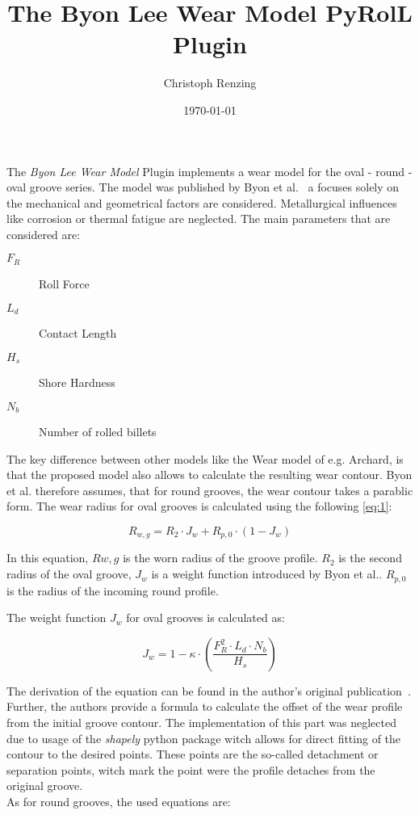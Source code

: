 \documentclass[11pt]{PyRollDocs}
\begin{document}
    \title{The Byon Lee Wear Model PyRolL Plugin}
    \author{Christoph Renzing}
    \date{\today}

    \maketitle

    The \emph{Byon Lee Wear Model} Plugin implements a wear model for the oval - round - oval groove series.
    The model was published by Byon et al.~\cite{Byon2007, Byon2008, Byon2008a} a focuses solely on the mechanical and geometrical factors are considered.
    Metallurgical influences like corrosion or thermal fatigue are neglected.
    The main parameters that are considered are:

    \begin{description}
        \item[$F_{R}$] Roll Force
        \item[$L_{d}$] Contact Length
        \item[$H_{s}$] Shore Hardness
        \item[$N_{b}$] Number of rolled billets
    \end{description}

    The key difference between other models like the Wear model of e.g. Archard, is that the proposed model also allows to calculate the resulting wear contour.
    Byon et al. therefore assumes, that for round grooves, the wear contour takes a parablic form.
    The wear radius for oval grooves is calculated using the following \autoref{eq:1}:

    \begin{equation}
        R_{w,g} = R_2 \cdot J_w + R_{p, 0} \cdot \left( 1 - J_w \right)
        \label{eq:1}
    \end{equation}

    In this equation, $R{w,g}$ is the worn radius of the groove profile.
    $R_2$ is the second radius of the oval groove, $J_w$ is a weight function introduced by Byon et al..
    $R_{p, 0}$ is the radius of the incoming round profile.

    The weight function $J_w$ for oval grooves is calculated as:

    \begin{equation}
        J_w = 1 - \kappa \cdot \left( \frac{F_R^2 \cdot L_d \cdot N_b}{H_s} \right)
        \label{eq:2}
    \end{equation}

    The derivation of the equation can be found in the author's original publication~\cite{Byon2008a}.
    Further, the authors provide a formula to calculate the offset of the wear profile from the initial groove contour.
    The implementation of this part was neglected due to usage of the \emph{shapely} python package witch allows for direct fitting of the contour to the desired points.
    These points are the so-called detachment or separation points, witch mark the point were the profile detaches from the original groove.\\
    As for round grooves, the used equations are:
\end{document}
